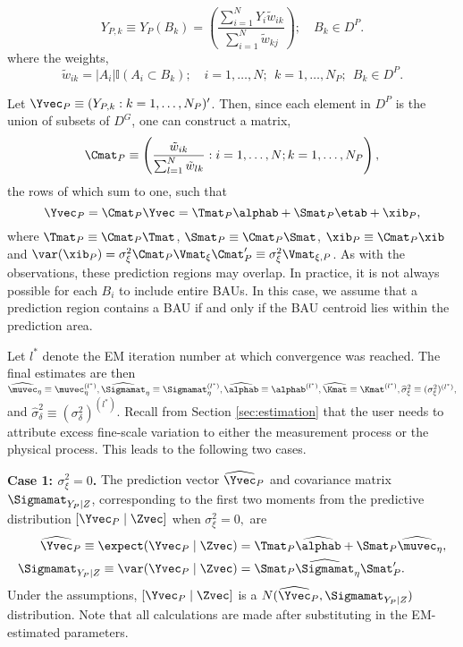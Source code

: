 \begin{equation}
Y_{P,k} \equiv Y_{P}(B_k) = \left(\frac{\sum_{i =1}^N Y_i \tilde w_{ik}}{\sum_{i=1}^N \tilde w_{kj}}\right); \quad B_k \in D^P.
\end{equation}
where the weights,
$$ \tilde w_{ik} = |A_i|\mathbb{I}(A_i \subset B_k); \quad i = 1,\dots,N;~~k = 1,\dots, N_P; ~~B_k \in D^P.$$

Let $\Yvec_P \equiv (Y_{P,k} : k = 1,\dots,N_P)'$. Then, since each element in $D^P$ is the union of subsets of $D^G$, one can construct a matrix,
\begin{equation}\label{eq:CP}
\Cmat_P \equiv \left(\frac{\tilde w_{ik}}{\sum_{l=1}^N \tilde w_{lk}} : i = 1,\dots,N; k = 1,\dots,N_P\right),
\end{equation}
the rows of which sum to one, such that
\begin{equation}
\Yvec_P = \Cmat_P\Yvec = \Tmat_P\alphab + \Smat_P\etab + \xib_P,
\end{equation}
where $\Tmat_P \equiv \Cmat_P \Tmat$, $\Smat_P \equiv \Cmat_P \Smat$, $\xib_P \equiv \Cmat_P \xib$ and $\var(\xib_P) = \sigma^2_\xi\Cmat_P\Vmat_\xi\Cmat_P' \equiv \sigma^2_\xi\Vmat_{\xi,P}$.  As with the observations, these prediction regions may overlap. In practice, it is not always possible for each $B_i$ to include entire BAUs. In this case, we assume that a prediction region contains a BAU if and only if the BAU centroid lies within the prediction area.

Let $l^*$ denote the EM iteration number at which convergence was reached. The final estimates are then $\widehat\muvec_\eta \equiv \muvec_\eta^{(l^*)}, \widehat\Sigmamat_\eta \equiv \Sigmamat_\eta^{(l^*)}, \widehat\alphab \equiv \alphab^{(l^*)}, \widehat\Kmat \equiv \Kmat^{(l^*)}, \widehat\sigma^2_\xi \equiv (\sigma^2_\xi)^{(l^*)},$ and $\widehat\sigma^2_\delta \equiv (\sigma^2_\delta)^{(l^*)}$. Recall from Section \ref{sec:estimation} that the user needs to attribute excess fine-scale variation to either the measurement process or the physical process. This leads to the following two cases.

{\bf Case 1: $\sigma^2_\xi = 0$.} The prediction vector $\widehat\Yvec_P$ and covariance matrix $\Sigmamat_{Y_P\mid Z}$, corresponding to the first two moments from the predictive distribution $[\Yvec_P \mid \Zvec]$ when $\sigma^2_\xi = 0,$ are
\begin{align}
\widehat\Yvec_P \equiv \expect(\Yvec_P \mid \Zvec) &= \Tmat_P\widehat\alphab + \Smat_P\widehat\muvec_\eta, \label{eq:smooth1}\\
\Sigmamat_{Y_P \mid Z} \equiv \var(\Yvec_P\mid \Zvec) &= \Smat_P \widehat\Sigmamat_\eta\Smat_P'. \label{eq:smooth2}
\end{align}
 Under the assumptions, $[\Yvec_P \mid \Zvec]$ is a $N(\widehat\Yvec_P,\Sigmamat_{Y_P \mid Z})$ distribution. Note that all calculations are made after substituting in the EM-estimated parameters.

